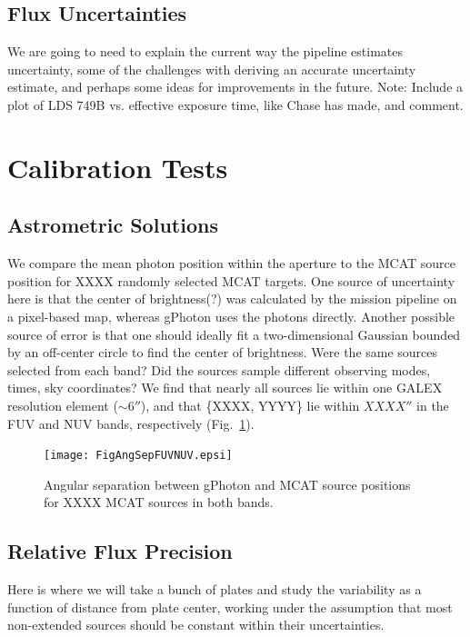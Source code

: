\documentclass[5p]{elsarticle}
\begin{document}
\subsection{Flux Uncertainties}
{\color{red}We are going to need to explain the current way the pipeline estimates uncertainty, some of the challenges with deriving an accurate uncertainty estimate, and perhaps some ideas for improvements in the future.}
{\color{red}Note: Include a plot of LDS 749B vs. effective exposure time, like Chase has made, and comment.}

\section{Calibration Tests}
\label{calibration}

\subsection{Astrometric Solutions}
We compare the mean photon position within the aperture to the MCAT source position for {\color{red}XXXX} randomly selected MCAT targets. One source of uncertainty here is that the {\color{red}center of brightness(?)} was calculated by the mission pipeline on a pixel-based map, whereas gPhoton uses the photons directly. Another possible source of error is that one should ideally fit a two-dimensional Gaussian bounded by an off-center circle to find the center of brightness.  {\color{red}Were the same sources selected from each band?  Did the sources sample different observing modes, times, sky coordinates?}  We find that nearly all sources lie within one GALEX resolution element ($\sim 6''$), and that \{{\color{red}XXXX, YYYY}\} lie within {\color{red}$XXXX''$} in the FUV and NUV bands, respectively (Fig.\ \ref{fuvnuvastrometry}).

\begin{figure}
\texttt{[image: FigAngSepFUVNUV.epsi]}
\caption{Angular separation between gPhoton and MCAT source positions for {\color{red}XXXX} MCAT sources in both bands. \label{fuvnuvastrometry}}
\end{figure}

\subsection{Relative Flux Precision}
{\color{red}Here is where we will take a bunch of plates and study the variability as a function of distance from plate center, working under the assumption that most non-extended sources should be constant within their uncertainties.}
\end{document}
